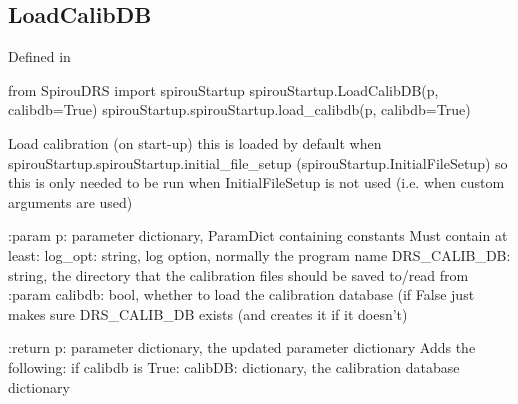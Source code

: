 
\noindent\begin{minipage}{\textwidth}
\subsection{LoadCalibDB}

Defined in \spirouStartup{}

\begin{pythonbox}
from SpirouDRS import spirouStartup
spirouStartup.LoadCalibDB(p, calibdb=True)
spirouStartup.spirouStartup.load_calibdb(p, calibdb=True)
\end{pythonbox}

\begin{pythondocstring}
Load calibration (on start-up) this is loaded by default when
spirouStartup.spirouStartup.initial_file_setup
(spirouStartup.InitialFileSetup) so this is only needed to be run when
InitialFileSetup is not used (i.e. when custom arguments are used)


:param p: parameter dictionary, ParamDict containing constants
    Must contain at least:
            log_opt: string, log option, normally the program name
            DRS_CALIB_DB: string, the directory that the calibration
                          files should be saved to/read from
:param calibdb: bool, whether to load the calibration database (if False
                just makes sure DRS_CALIB_DB exists (and creates it if it
                doesn't)

:return p: parameter dictionary, the updated parameter dictionary
        Adds the following:
            if calibdb is True:
                calibDB: dictionary, the calibration database dictionary
\end{pythondocstring}
\end{minipage}



